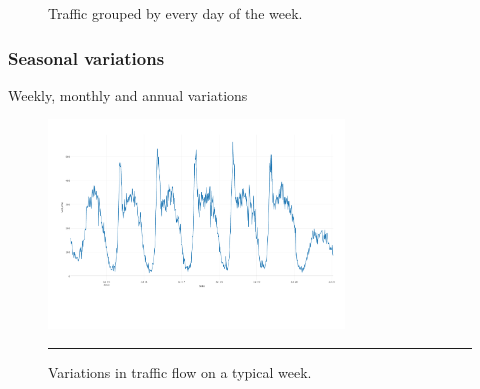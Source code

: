 \begin{figure}[h]
    \qquad


    \caption[Traffic grouped by every day of the week]{Traffic grouped by every day of the week.}
    \label{fig:TypicalDayTraffic}
\end{figure}

\subsubsection{Seasonal variations}

Weekly, monthly and annual variations

\begin{figure}[h]
   \centering
    \includegraphics[width=0.7\textwidth,height=0.7\textheight,keepaspectratio]{Figures/typical-week.pdf}
    \rule{35em}{0.5pt}
  \caption[A typical week traffic flow]{Variations in traffic flow on a typical week.}
  \label{fig:TypicalWeek}
\end{figure}

